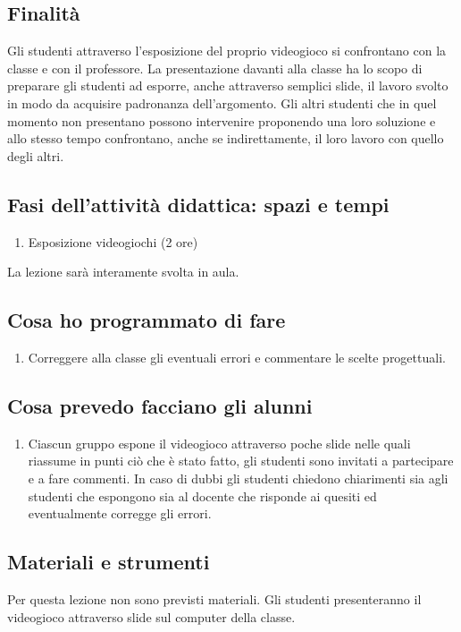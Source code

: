 \documentclass[12pt,a4paper]{article}
\begin{document}
\subsection*{Finalità}
Gli studenti attraverso l’esposizione del proprio videogioco si confrontano con la classe e con il professore. La presentazione davanti alla classe ha lo scopo di preparare gli studenti ad esporre, anche attraverso semplici slide, il lavoro svolto in modo da acquisire padronanza dell’argomento. Gli altri studenti che in quel momento non presentano possono intervenire proponendo una loro soluzione e allo stesso tempo confrontano, anche se indirettamente, il loro lavoro con quello degli altri.


\subsection*{Fasi dell'attività didattica: spazi e tempi}

\begin{enumerate}
	\item Esposizione videogiochi (2 ore)
\end{enumerate}
La lezione sarà interamente svolta in aula.

\subsection*{Cosa ho programmato di fare}
\begin{enumerate}
	\item Correggere alla classe gli eventuali errori e commentare le scelte progettuali. 
\end{enumerate}
\subsection*{Cosa prevedo facciano gli alunni}

\begin{enumerate}
	\item Ciascun gruppo espone il videogioco attraverso poche slide nelle quali riassume in punti ciò che è stato fatto, gli studenti sono invitati a partecipare e a fare commenti. In caso di dubbi gli studenti chiedono chiarimenti sia agli studenti che espongono sia al docente che risponde ai quesiti ed eventualmente corregge gli errori.
\end{enumerate}

\subsection*{Materiali e strumenti}
Per questa lezione non sono previsti materiali. Gli studenti presenteranno il videogioco attraverso slide sul computer della classe.
\end{document}
